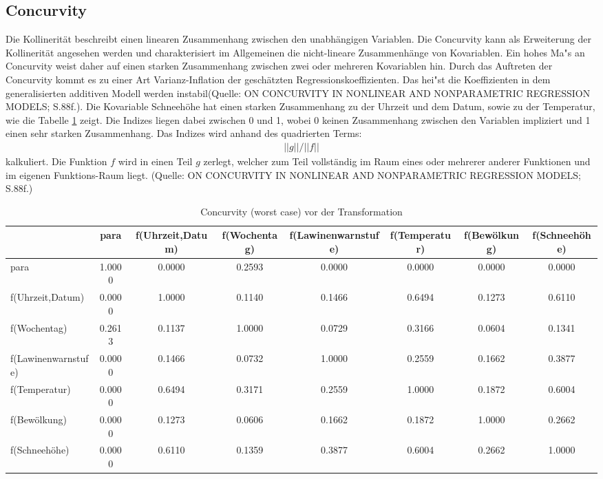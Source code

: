 \subsection{Concurvity}
Die Kollinerität beschreibt einen linearen Zusammenhang zwischen den unabhängigen Variablen. Die Concurvity kann als Erweiterung der Kollinerität angesehen werden und charakterisiert im Allgemeinen die nicht-lineare Zusammenhänge von Kovariablen. Ein hohes Ma"s an Concurvity weist daher auf einen starken Zusammenhang zwischen zwei oder mehreren Kovariablen hin. Durch das Auftreten der Concurvity kommt es zu einer Art Varianz-Inflation der geschätzten Regressionskoeffizienten. Das hei"st die Koeffizienten in dem generalisierten additiven Modell werden instabil(Quelle: ON CONCURVITY IN NONLINEAR AND NONPARAMETRIC REGRESSION MODELS; S.88f.). Die Kovariable Schneehöhe hat einen starken Zusammenhang zu der Uhrzeit und dem Datum, sowie zu der Temperatur, wie die Tabelle \ref{con1} zeigt. Die Indizes liegen dabei zwischen 0 und 1, wobei 0 keinen Zusammenhang zwischen den Variablen impliziert und 1 einen sehr starken Zusammenhang. Das Indizes wird anhand des quadrierten Terms:
\begin{align}
||g||/||f|| 
\end{align}
kalkuliert.
Die Funktion $f$ wird in einen Teil $g$ zerlegt, welcher zum Teil vollständig im Raum eines oder mehrerer anderer Funktionen und im eigenen Funktions-Raum liegt.  (Quelle: ON CONCURVITY IN NONLINEAR AND NONPARAMETRIC REGRESSION MODELS; S.88f.)
\begin{table}[htbp]
	\centering
	\vspace{-1em}
	\caption{Concurvity (worst case) vor der Transformation}
	\begin{adjustbox}{max width=\textwidth}
	\begin{tabular}{lccccccc}
		& para & f(Uhrzeit,Datum) & f(Wochentag) & f(Lawinenwarnstufe) & f(Temperatur) & f(Bewölkung) & f(Schneehöhe) \\
		\midrule
		\midrule
		para  & 1.0000 & 0.0000 & 0.2593 & 0.0000 & 0.0000 & 0.0000 & 0.0000 \\
		f(Uhrzeit,Datum) & 0.0000 & 1.0000 & 0.1140 & 0.1466 & 0.6494 & 0.1273 & \cellcolor{blue!25}0.6110 \\
		f(Wochentag) & 0.2613 & 0.1137 & 1.0000 & 0.0729 & 0.3166 & 0.0604 & 0.1341 \\
		f(Lawinenwarnstufe) & 0.0000 & 0.1466 & 0.0732 & 1.0000 & 0.2559 & 0.1662 & 0.3877 \\
		f(Temperatur) & 0.0000 & 0.6494 & 0.3171 & 0.2559 & 1.0000 & 0.1872 & \cellcolor{blue!25}0.6004 \\
		f(Bewölkung) & 0.0000 & 0.1273 & 0.0606 & 0.1662 & 0.1872 & 1.0000 & 0.2662 \\
		f(Schneehöhe) & 0.0000 & 0.6110  & 0.1359 & 0.3877 & 0.6004 & 0.2662 & 1.0000 \\
		\bottomrule
	\end{tabular}%
	\label{con1}%
	\end{adjustbox}
\end{table}%

